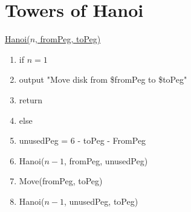 \documentclass[10pt]{article}
\newenvironment{menumerate}
{
  \begin{enumerate}
  \setlength{\itemsep}{1pt}
  \setlength{\parskip}{0pt}
  \setlength{\parsep}{0pt}}{\end{enumerate}
}
\begin{document}
\section*{Towers of Hanoi}
\noindent \underline{Hanoi($n$, fromPeg, toPeg)}
\begin{menumerate}
\item if $n = 1$
\item \hspace{24pt} output "Move disk from \$fromPeg to \$toPeg"
\item \hspace{24pt} return
\item else
\item \hspace{24pt} unusedPeg = 6 - toPeg - FromPeg
\item \hspace{24pt} Hanoi($n - 1$, fromPeg, unusedPeg)
\item \hspace{24pt} Move(fromPeg, toPeg)
\item \hspace{24pt} Hanoi($n - 1$, unusedPeg, toPeg)
\end{menumerate}
\end{document}
